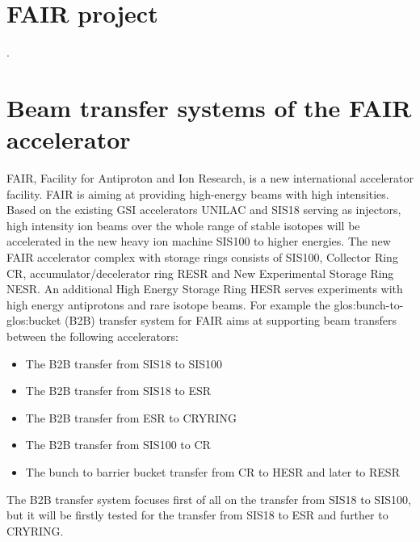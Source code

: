 \section{FAIR project }


.

\section{Beam transfer systems of the FAIR accelerator}
FAIR, Facility for Antiproton and Ion Research, is a new international accelerator facility. FAIR is aiming at providing high-energy beams with high intensities. Based on the existing GSI accelerators UNILAC and SIS18 serving as injectors, high intensity ion beams over the whole range of stable isotopes will be accelerated in the new heavy ion machine SIS100 to higher energies. The new FAIR accelerator complex with storage rings consists of SIS100, Collector Ring CR, accumulator/decelerator ring RESR and New Experimental Storage Ring NESR. An additional High Energy Storage Ring HESR serves experiments with high energy antiprotons and rare isotope beams.  
For example the \gls{glos:bunch}-to-\gls{glos:bucket} (\gls{B2B}) transfer system for FAIR aims at supporting beam transfers between the following accelerators:
\begin{itemize}
\item The B2B transfer from SIS18 to SIS100
\item The B2B transfer from SIS18 to ESR
\item The B2B transfer from ESR to CRYRING
\item The B2B transfer from SIS100 to CR
\item The bunch to barrier bucket transfer from CR to HESR and later to RESR
\end{itemize}

The B2B transfer system focuses first of all on the transfer from SIS18 to SIS100, but it will be firstly tested for the transfer from SIS18 to ESR and further to CRYRING.


